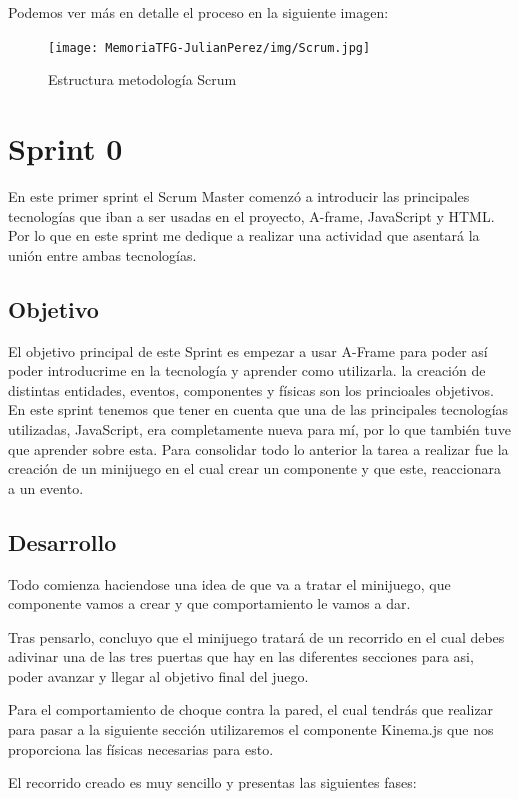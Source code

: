 \documentclass[a4paper, 12pt]{book}
\begin{document}
Podemos ver más en detalle el proceso en la siguiente imagen:
\begin{figure}[H]
  \centering
  \texttt{[image: MemoriaTFG-JulianPerez/img/Scrum.jpg]}
  \caption{Estructura metodología Scrum}\label{scrum}
\end{figure}

\section{Sprint 0} %
\label{sec:sprint0}
En este primer sprint el Scrum Master comenzó a introducir las principales tecnologías que iban a ser usadas en el proyecto, A-frame, JavaScript y HTML. Por lo que en este sprint me dedique a realizar una actividad que asentará la unión entre ambas tecnologías.

\subsection{Objetivo}
El objetivo principal de este Sprint es empezar a usar A-Frame para poder así poder introducrime en la tecnología y aprender como utilizarla. la creación de distintas entidades, eventos, componentes y físicas son los princioales objetivos. En este sprint tenemos que tener en cuenta que una de las principales tecnologías utilizadas, JavaScript, era completamente nueva para mí, por lo que también tuve que aprender sobre esta. Para consolidar todo lo anterior la tarea a realizar fue la creación de un minijuego en el cual crear un componente y que este, reaccionara a un evento.

\subsection{Desarrollo}
Todo comienza haciendose una idea de que va a tratar el minijuego, que componente vamos a crear y que comportamiento le vamos a dar.

Tras pensarlo, concluyo que el minijuego tratará de un recorrido en el cual debes adivinar una de las tres puertas que hay en las diferentes secciones para asi, poder avanzar y llegar al objetivo final del juego.

Para el comportamiento de choque contra la pared, el cual tendrás que realizar para pasar a la siguiente sección utilizaremos el componente Kinema.js que nos proporciona las físicas necesarias para esto. 

El recorrido creado es muy sencillo y presentas las siguientes fases:
\end{document}
